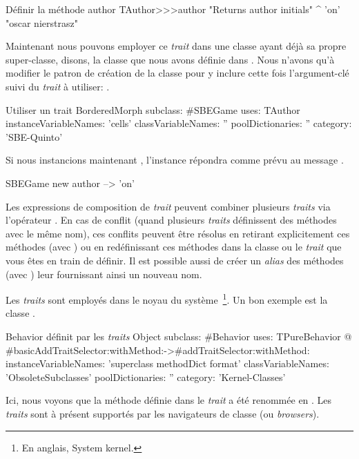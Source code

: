 \documentclass[a4paper,10pt,twoside]{book}
\begin{document}
\begin{method}[author]{D\'efinir la m\'ethode author}
TAuthor>>>author
    "Returns author initials"
	^ 'on'    "oscar nierstrasz"
\end{method}

\noindent
Maintenant nous pouvons employer ce \emph{trait} dans une classe ayant d\'ej\`a sa propre super-classe, disons, la classe  que nous avons d\'efinie dans .
Nous n'avons qu'\`a modifier le patron de cr\'eation de la classe  pour y inclure cette fois l'argument-cl\'e  suivi du \emph{trait} \`a utiliser: .

\begin{classdef}[sbegamewithtrait]{Utiliser un trait}
BorderedMorph subclass: #SBEGame
	uses: TAuthor
	instanceVariableNames: 'cells'
	classVariableNames: ''
	poolDictionaries: ''
	category: 'SBE-Quinto'
\end{classdef}

Si nous instancions maintenant , l'instance r\'epondra comme pr\'evu au message .

\begin{code}{}
SBEGame new author --> 'on'
\end{code}

Les expressions de composition de \emph{trait} peuvent combiner plusieurs \emph{traits} via l'op\'erateur \ct{+}.
En cas de conflit (\ie quand plusieurs \emph{traits} d\'efinissent des m\'ethodes avec le m\^eme nom), ces conflits peuvent \^etre r\'esolus en retirant explicitement ces m\'ethodes (avec \ct{-}) ou en red\'efinissant ces m\'ethodes dans la classe ou le \emph{trait} que vous \^etes en train de d\'efinir.
Il est possible aussi de cr\'eer un \emph{alias} des m\'ethodes (avec ) 
leur fournissant ainsi un nouveau nom.

Les \emph{traits} sont employ\'es dans le noyau du syst\`eme~\footnote{En anglais, System kernel.}.
Un bon exemple est la classe .

\begin{classdef}[behaviorwithtraits]{Behavior d\'efinit par les \emph{traits}}
Object subclass: #Behavior
	uses: TPureBehavior @ {#basicAddTraitSelector:withMethod:->#addTraitSelector:withMethod:}
	instanceVariableNames: 'superclass methodDict format'
	classVariableNames: 'ObsoleteSubclasses'
	poolDictionaries: ''
	category: 'Kernel-Classes'
\end{classdef}
\noindent
Ici, nous voyons que la m\'ethode  d\'efinie dans le \emph{trait}  a \'et\'e renomm\'ee en \mbox{.}
Les \emph{traits} sont \`a pr\'esent support\'es par les navigateurs de classe (ou \emph{browsers}).
\end{document}
